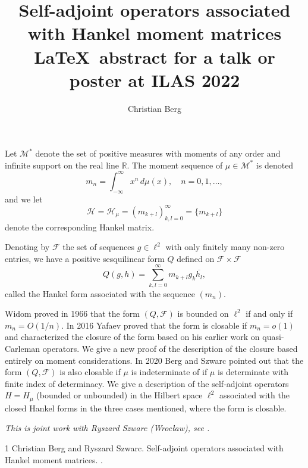 \documentclass[a4paper]{amsart}
\date{}
\begin{document}
\title{Self-adjoint operators associated with Hankel moment matrices \LaTeX\ abstract for a talk or poster at ILAS 2022}
\author{Christian Berg} %
\address{University of Copenhagen, Denmark} %

\maketitle
Let $\mathcal M^*$ denote the set of positive measures with moments of any order and infinite support on the real line $\mathbb R$. The moment sequence  of $\mu\in\mathcal M^*$ is denoted
\begin{equation}\label{eq:mom}
m_n=\int_{-\infty}^\infty x^n\,d\mu(x),\quad n=0,1,\ldots,
\end{equation} 
and we let
\begin{equation}\label{eq:Han}
\mathcal H=\mathcal H_\mu=\left(m_{k+l}\right)_{k,l=0}^\infty=\{m_{k+l}\}
\end{equation}
denote the corresponding Hankel matrix.


 Denoting by $\mathcal F$ the set of sequences $g\in\ell^2$ with only finitely many non-zero entries, we have  a positive sesquilinear form $Q$ defined on $\mathcal F\times\mathcal F$
\begin{equation}\label{eq:quadr}
Q(g,h)=\sum_{k,l=0}^\infty m_{k+l}g_k\overline{h_l}, 
\end{equation}
called the Hankel form associated with the  sequence $(m_n)$.

Widom proved in 1966 that the form $(Q,\mathcal F)$ is bounded on $\ell^2$ if and only if $m_n=O(1/n)$. In 2016 Yafaev proved that the form is closable if
 $m_n=o(1)$ and characterized the closure of the form based on his earlier work on quasi-Carleman operators. We give a new proof of the description of the closure based entirely on moment considerations. In 2020 Berg and Szwarc pointed out that the form $(Q,\mathcal F)$ 
is also closable if $\mu$ is indeterminate of if $\mu$ is determinate with finite index of determinacy. 
We give  a description of the self-adjoint   operators $H=H_\mu$ (bounded or unbounded) in the Hilbert space $\ell^2$
associated with the closed Hankel forms in the  three cases mentioned, where the form is closable. 





\emph{This is joint work with Ryszard Szwarc (Wroc{\l}aw), see \cite{besz8}.}


\begin{thebibliography}{1}
 Christian Berg and Ryszard Szwarc.
\newblock Self-adjoint operators associated with Hankel moment matrices.
.


\end{thebibliography}
\end{document}
